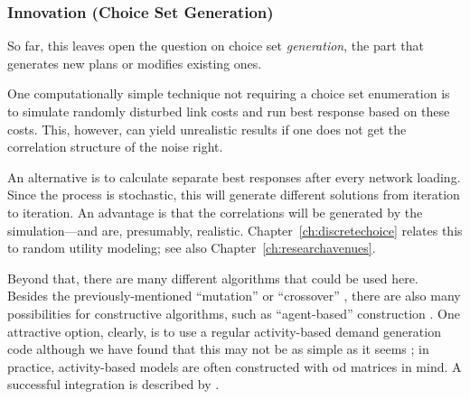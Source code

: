 
\subsubsection{Innovation (Choice Set Generation)}
\label{sec:innovation}

So far, this leaves open the question on choice set
\emph{generation}, \ie the part that generates new plans or modifies
existing ones.  

One computationally simple technique not requiring a choice
set enumeration is to simulate randomly disturbed link costs and 
run best response based on these costs. This, however, can yield
unrealistic results if one does not get the correlation structure of
the noise right.

An alternative is to calculate separate best responses after every
network loading.  Since the process is stochastic, this will generate
different solutions from iteration to iteration.  An advantage is that
the correlations will be generated by the simulation---and are, 
presumably, realistic. Chapter~\ref{ch:discretechoice}
relates this to random utility modeling; see also Chapter~\ref{ch:researchavenues}.

Beyond that, there are many different algorithms that
could be used here.  Besides the previously-mentioned ``mutation''
\citep{BalmerRaneyEtAl2005act-times} or ``crossover''
\citep{CharyparNagel2005ga4acts,MeisterBalmerEtc2006planomatIatbr},
there are also many possibilities for constructive algorithms, such as
``agent-based'' construction
\citep{ZhuLevinsonZhang2008AgentBasedRouteChoice2}.  One attractive
option, clearly, is to use a regular activity-based demand generation
code \citep[e.g.,][]{BowmanEtc1999PortlandActs,MillerRoordaTASHA}\corr{}{,}
although we have found  that this may not be as simple as it seems
\citep{RieserNagelEtc2007early-berlin-trr}; in practice,
activity-based models are often constructed with \gls{od} matrices in mind.  
A successful integration is described by 
\cite{ZiemkeNagelBhatIntegratingCemdapMatsimTransferability}.


